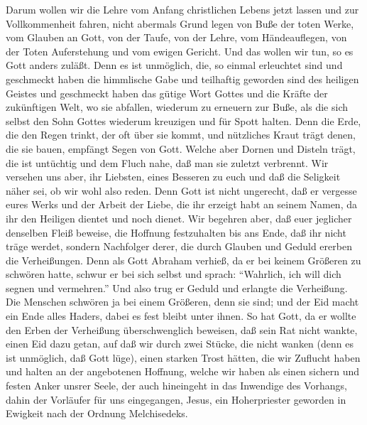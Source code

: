  Darum wollen wir die Lehre vom Anfang christlichen Lebens
jetzt lassen und zur Vollkommenheit fahren, nicht abermals Grund legen
von Buße der toten Werke, vom Glauben an Gott,  von der
Taufe, von der Lehre, vom Händeauflegen, von der Toten Auferstehung und
vom ewigen Gericht.  Und das wollen wir tun, so es Gott
anders zuläßt.  Denn es ist unmöglich, die, so einmal
erleuchtet sind und geschmeckt haben die himmlische Gabe und teilhaftig
geworden sind des heiligen Geistes  und geschmeckt haben das
gütige Wort Gottes und die Kräfte der zukünftigen Welt,  wo
sie abfallen, wiederum zu erneuern zur Buße, als die sich selbst den
Sohn Gottes wiederum kreuzigen und für Spott halten.  Denn
die Erde, die den Regen trinkt, der oft über sie kommt, und nützliches
Kraut trägt denen, die sie bauen, empfängt Segen von Gott. 
Welche aber Dornen und Disteln trägt, die ist untüchtig und dem Fluch
nahe, daß man sie zuletzt verbrennt.  Wir versehen uns aber,
ihr Liebsten, eines Besseren zu euch und daß die Seligkeit näher sei, ob
wir wohl also reden.  Denn Gott ist nicht ungerecht, daß er
vergesse eures Werks und der Arbeit der Liebe, die ihr erzeigt habt an
seinem Namen, da ihr den Heiligen dientet und noch dienet. 
Wir begehren aber, daß euer jeglicher denselben Fleiß beweise, die
Hoffnung festzuhalten bis ans Ende,  daß ihr nicht träge
werdet, sondern Nachfolger derer, die durch Glauben und Geduld ererben
die Verheißungen.  Denn als Gott Abraham verhieß, da er bei
keinem Größeren zu schwören hatte, schwur er bei sich selbst
 und sprach: ``Wahrlich, ich will dich segnen und
vermehren.''  Und also trug er Geduld und erlangte die
Verheißung.  Die Menschen schwören ja bei einem Größeren,
denn sie sind; und der Eid macht ein Ende alles Haders, dabei es fest
bleibt unter ihnen.  So hat Gott, da er wollte den Erben
der Verheißung überschwenglich beweisen, daß sein Rat nicht wankte,
einen Eid dazu getan,  auf daß wir durch zwei Stücke, die
nicht wanken (denn es ist unmöglich, daß Gott lüge), einen starken Trost
hätten, die wir Zuflucht haben und halten an der angebotenen Hoffnung,
 welche wir haben als einen sichern und festen Anker unsrer
Seele, der auch hineingeht in das Inwendige des Vorhangs, 
dahin der Vorläufer für uns eingegangen, Jesus, ein Hoherpriester
geworden in Ewigkeit nach der Ordnung Melchisedeks.

